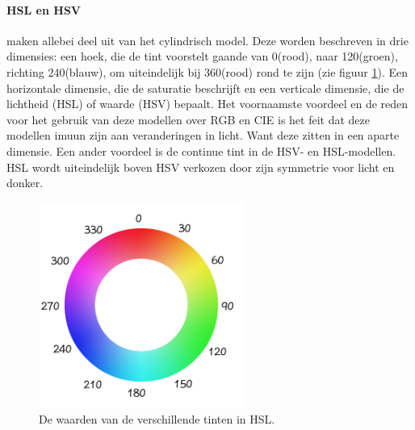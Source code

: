 \paragraph{HSL en HSV} maken allebei deel uit van het cylindrisch model. Deze worden beschreven in drie dimensies: een hoek, die de tint voorstelt gaande van 0\degree (rood), naar 120\degree (groen), richting 240\degree (blauw), om uiteindelijk bij 360\degree (rood) rond te zijn (zie figuur \ref{colorWheel}). Een horizontale dimensie, die de saturatie beschrijft en een verticale dimensie, die de lichtheid (HSL) of waarde (HSV) bepaalt. Het voornaamste voordeel en de reden voor het gebruik van deze modellen over RGB en CIE is het feit dat deze modellen imuun zijn aan veranderingen in licht. Want deze zitten in een aparte dimensie. Een ander voordeel is de continue tint in de HSV- en HSL-modellen. HSL wordt uiteindelijk boven HSV verkozen door zijn symmetrie voor licht en donker. \cite{inbook} \cite{rasouli2017effect}

\begin{figure}[H]
	\center
	\includegraphics[width=0.6\textwidth]{img/hslColorWheel.png}
	\caption{De waarden van de verschillende tinten in HSL. \cite{hslColorWheel}}
	\label{colorWheel}
\end{figure}

